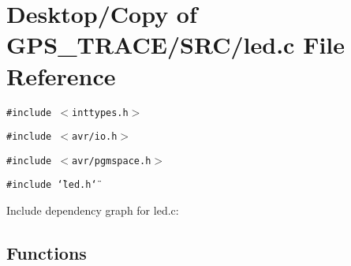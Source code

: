 \section{Desktop/Copy of GPS\_\-TRACE/SRC/led.c File Reference}
\label{led_8c}
{\tt \#include $<$inttypes.h$>$}\par
{\tt \#include $<$avr/io.h$>$}\par
{\tt \#include $<$avr/pgmspace.h$>$}\par
{\tt \#include \char`\"{}led.h\char`\"{}}\par


Include dependency graph for led.c:\subsection*{Functions}
